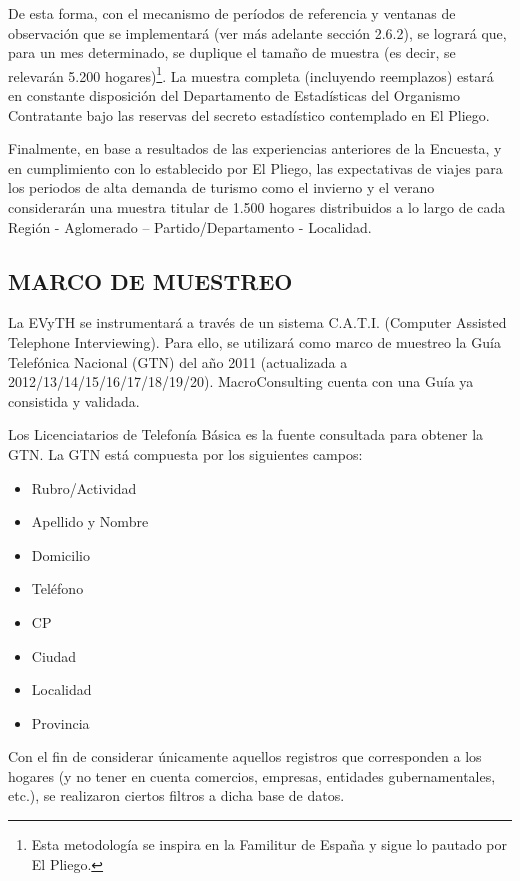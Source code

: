 \documentclass[
  openany]{book}
\begin{document}
De esta forma, con el mecanismo de períodos de referencia y ventanas de observación que se implementará (ver más adelante sección 2.6.2), se logrará que, para un mes determinado, se duplique el tamaño de muestra (es decir, se relevarán 5.200 hogares)\footnote{Esta metodología se inspira en la Familitur de España y sigue lo pautado por El Pliego.}.
La muestra completa (incluyendo reemplazos) estará en constante disposición del Departamento de Estadísticas del Organismo Contratante bajo las reservas del secreto estadístico contemplado en El Pliego.

Finalmente, en base a resultados de las experiencias anteriores de la Encuesta, y en cumplimiento con lo establecido por El Pliego, las expectativas de viajes para los periodos de alta demanda de turismo como el invierno y el verano considerarán una muestra titular de 1.500 hogares distribuidos a lo largo de cada Región - Aglomerado -- Partido/Departamento - Localidad.

\hypertarget{marco-de-muestreo}{%
\subsection{\texorpdfstring{\textbf{MARCO DE MUESTREO}}{MARCO DE MUESTREO}}\label{marco-de-muestreo}}

La EVyTH se instrumentará a través de un sistema C.A.T.I. (Computer Assisted Telephone Interviewing).
Para ello, se utilizará como marco de muestreo la Guía Telefónica Nacional (GTN) del año 2011 (actualizada a 2012/13/14/15/16/17/18/19/20).
MacroConsulting cuenta con una Guía ya consistida y validada.

Los Licenciatarios de Telefonía Básica es la fuente consultada para obtener la GTN.
La GTN está compuesta por los siguientes campos:

\begin{itemize}
\item
  Rubro/Actividad
\item
  Apellido y Nombre
\item
  Domicilio
\item
  Teléfono
\item
  CP
\item
  Ciudad
\item
  Localidad
\item
  Provincia
\end{itemize}

Con el fin de considerar únicamente aquellos registros que corresponden a los hogares (y no tener en cuenta comercios, empresas, entidades gubernamentales, etc.), se realizaron ciertos filtros a dicha base de datos.
\end{document}
